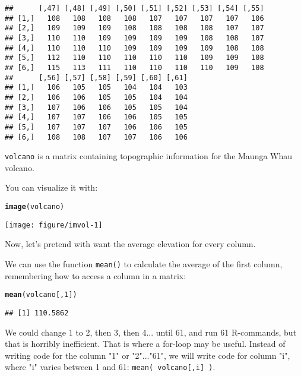 \documentclass[12pt,a4paper]{scrartcl}\usepackage[]{graphicx}\usepackage[]{color}
\makeatletter
\def\maxwidth{ %
  \ifdim\Gin@nat@width>\linewidth
    \linewidth
  \else
    \Gin@nat@width
  \fi
}
\newcommand{\hlnum}[1]{\textcolor[rgb]{0.686,0.059,0.569}{#1}}%
\newcommand{\hlstd}[1]{\textcolor[rgb]{0.345,0.345,0.345}{#1}}%
\newcommand{\hlkwd}[1]{\textcolor[rgb]{0.737,0.353,0.396}{\textbf{#1}}}%
\newenvironment{kframe}{%
 \def\at@end@of@kframe{}%
 \ifinner\ifhmode%
  \def\at@end@of@kframe{\end{minipage}}%
  \begin{minipage}{\columnwidth}%
 \fi\fi%
 \def\FrameCommand##1{\hskip\@totalleftmargin \hskip-\fboxsep
 \colorbox{shadecolor}{##1}\hskip-\fboxsep
     \hskip-\linewidth \hskip-\@totalleftmargin \hskip\columnwidth}%
 \MakeFramed {\advance\hsize-\width
   \@totalleftmargin\z@ \linewidth\hsize
   \@setminipage}}%
 {\par\unskip\endMakeFramed%
 \at@end@of@kframe}
\newenvironment{knitrout}{}{} %
\makeatother
\begin{document}
\begin{knitrout}
\begin{kframe}
\begin{verbatim}
##      [,47] [,48] [,49] [,50] [,51] [,52] [,53] [,54] [,55]
## [1,]   108   108   108   108   107   107   107   107   106
## [2,]   109   109   109   108   108   108   108   107   107
## [3,]   110   110   109   109   109   109   108   108   107
## [4,]   110   110   110   109   109   109   109   108   108
## [5,]   112   110   110   110   110   110   109   109   108
## [6,]   115   113   111   110   110   110   110   109   108
##      [,56] [,57] [,58] [,59] [,60] [,61]
## [1,]   106   105   105   104   104   103
## [2,]   106   106   105   105   104   104
## [3,]   107   106   106   105   105   104
## [4,]   107   107   106   106   105   105
## [5,]   107   107   107   106   106   105
## [6,]   108   108   107   107   106   106
\end{verbatim}
\end{kframe}
\end{knitrout}

\texttt{volcano} is a matrix containing topographic information for the Maunga Whau volcano.

You can visualize it with:
\begin{knitrout}
\color{fgcolor}\begin{kframe}
\begin{alltt}
\hlkwd{image}\hlstd{(volcano)}
\end{alltt}
\end{kframe}
\texttt{[image: figure/imvol-1]} 

\end{knitrout}

Now, let's pretend with want the average elevation for every column.

We can use the function \texttt{mean()} to calculate the average of the first column, remembering how to access a column in a matrix:
\begin{knitrout}
\color{fgcolor}\begin{kframe}
\begin{alltt}
\hlkwd{mean}\hlstd{( volcano[,}\hlnum{1}\hlstd{] )}
\end{alltt}
\begin{verbatim}
## [1] 110.5862
\end{verbatim}
\end{kframe}
\end{knitrout}

We could change 1 to 2, then 3, then 4... until 61, and run 61 R-commands, but that is horribly inefficient. 
That is where a for-loop may be useful. Instead of writing code for the column "1" or "2"..."61",  we will write code for column "i", where "i" varies between 1 and 61: \texttt{mean( volcano[,i] )}.
\end{document}
